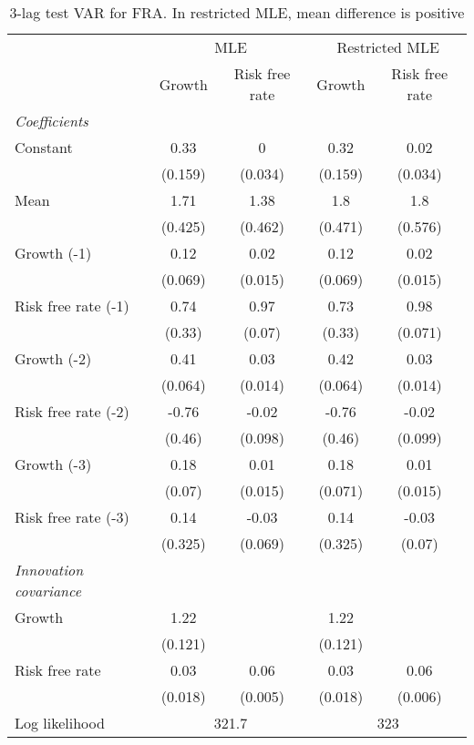 \begin{table}[htbp] 
	\centering 
	\begin{tabular}{@{\extracolsep{4pt}}lcccc@{}}		\hline\hline
		 		 & \multicolumn{2}{c}{MLE} &\multicolumn{2}{c}{Restricted MLE} \\ 
 		 & Growth 	 & Risk free rate 	 & Growth 	 & Risk free rate\\\cline{2-3}\cline{4-5}
\rule{0pt}{4ex} 
 \emph{Coefficients} 	  		 & 		 & 		 & 		 &\\ 
\quad Constant 	 & 0.33 	 & 0 	 & 0.32 	 & 0.02	 \\ 
 		 & (0.159) 	 & (0.034) 	 & (0.159) 	 & (0.034) 	 \\ 
\quad Mean 	 & 1.71 	 & 1.38 	 & 1.8 	 & 1.8	 \\ 
 		 & (0.425) 	 & (0.462) 	 & (0.471) 	 & (0.576) 	 \\ 
\quad Growth (-1) 	 &0.12 	 & 0.02 	 & 0.12 	 & 0.02	 \\ 
 		 & (0.069) 	 & (0.015) 	 & (0.069) 	 & (0.015) 	 \\ 
\quad Risk free rate (-1) 	 &0.74 	 & 0.97 	 & 0.73 	 & 0.98	 \\ 
 		 & (0.33) 	 & (0.07) 	 & (0.33) 	 & (0.071) 	 \\ 
\quad Growth (-2) 	 &0.41 	 & 0.03 	 & 0.42 	 & 0.03	 \\ 
 		 & (0.064) 	 & (0.014) 	 & (0.064) 	 & (0.014) 	 \\ 
\quad Risk free rate (-2) 	 &-0.76 	 & -0.02 	 & -0.76 	 & -0.02	 \\ 
 		 & (0.46) 	 & (0.098) 	 & (0.46) 	 & (0.099) 	 \\ 
\quad Growth (-3) 	 &0.18 	 & 0.01 	 & 0.18 	 & 0.01	 \\ 
 		 & (0.07) 	 & (0.015) 	 & (0.071) 	 & (0.015) 	 \\ 
\quad Risk free rate (-3) 	 &0.14 	 & -0.03 	 & 0.14 	 & -0.03	 \\ 
 		 & (0.325) 	 & (0.069) 	 & (0.325) 	 & (0.07) 	 \\ 
\rule{0pt}{4ex} \emph{Innovation covariance}  	 & 	 & 	 & 	 &\\ 
\quad Growth 	 &1.22 	 &  	 & 1.22 	 & 	 \\ 
 		 & (0.121) 	 &  	 & (0.121) 	 &  	 \\ 
\quad Risk free rate 	 &0.03 	 & 0.06 	 & 0.03 	 & 0.06	 \\ 
 		 & (0.018) 	 & (0.005) 	 & (0.018) 	 & (0.006) 	 \\ 
 \hline \rule{0pt}{4ex} 
  Log likelihood 	 &\multicolumn{2}{c}{321.7} 	 & \multicolumn{2}{c}{323}\\ 

 \hline 	\end{tabular}		\caption{3-lag test VAR for FRA. In restricted MLE,
                                mean difference is positive}
		\label{tab:FRA3lag}

\end{table}